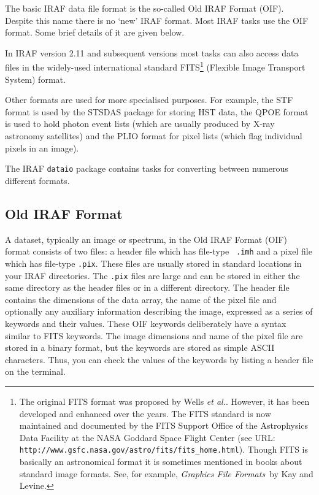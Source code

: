 \documentclass[twoside,11pt]{article}
\newcommand{\htmladdnormallink}[2]{#1}
\begin{document}
The basic IRAF data file format is the so-called Old IRAF Format (OIF).
Despite this name there is no `new' IRAF format.  Most IRAF
tasks use the OIF format.  Some brief details of it are given below.

In IRAF version 2.11 and subsequent versions most tasks can also
access data files in the widely-used international standard
FITS\footnote{The original FITS format was proposed by Wells {\it et
al.}\/\cite{WELLS81}.  However, it has been developed and enhanced over
the years.  The FITS standard is now maintained and documented by the
FITS Support Office of the Astrophysics Data Facility at the NASA
Goddard Space Flight Center (see URL: \htmladdnormallink{ {\tt
http://www.gsfc.nasa.gov/astro/fits/fits\_home.html}}
{http://www.gsfc.nasa.gov/astro/fits/fits\_home.html}).
Though FITS is basically an astronomical format it is sometimes
mentioned in books about standard image formats.  See, for example,
{\it Graphics File Formats}\, by Kay and Levine\cite{KAY95}.}
(Flexible Image Transport System) format.

Other formats are used for more specialised purposes.  For example,
the STF format is used by the STSDAS package for storing HST data,
the QPOE format is used to hold photon event lists (which are
usually produced by X-ray astronomy satellites) and the PLIO format
for pixel lists (which flag individual pixels in an image).

The IRAF {\tt dataio} package contains tasks for converting between
numerous different formats.

\subsection{Old IRAF Format}

A dataset, typically an image or spectrum, in the Old IRAF Format (OIF)
format consists of two files: a header file which has file-type {\tt
.imh} and a pixel file which has file-type {\tt .pix}.  These files
are usually stored in standard locations in your IRAF directories.
The {\tt .pix} files are large and can be stored in either the same
directory as the header files or in a different directory.  The header
file contains the dimensions of the data array, the name of the pixel file
and optionally any auxiliary information describing the image, expressed
as a series of keywords and their values.  These OIF keywords deliberately
have a syntax similar to FITS keywords.  The image dimensions and name of
the pixel file are stored in a binary format, but the keywords are stored
as simple ASCII characters.  Thus, you can check the values of the keywords
by listing a header file on the terminal.
\end{document}
